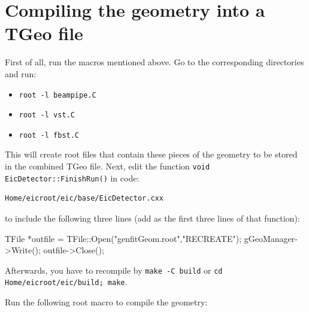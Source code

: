 \documentclass[12pt]{article}
\begin{document}
\section{Compiling the geometry into a TGeo file}

First of all, run the macros mentioned above. Go to the corresponding directories and run:

\begin{itemize}
\item \verb|root -l beampipe.C|
\item \verb|root -l vst.C|
\item \verb|root -l fbst.C|
\end{itemize}
This will create root files that contain these pieces of the geometry to be stored in the combined TGeo file.
Next, edit the function \verb|void EicDetector::FinishRun()| in code:

\begin{tcolorbox}
\begin{verbatim}
Home/eicroot/eic/base/EicDetector.cxx
\end{verbatim}  
\end{tcolorbox}

to include the following three lines (add as the first three lines of that function):

\begin{tcolorbox}
\begin{verbnobox}[\scriptsize]
TFile *outfile = TFile::Open("genfitGeom.root","RECREATE");
gGeoManager->Write();
outfile->Close();
\end{verbnobox}  
\end{tcolorbox}

Afterwards, you have to recompile by \verb|make -C build| or \verb|cd Home/eicroot/eic/build; make|.

Run the following root macro to compile the geometry:
\end{document}
